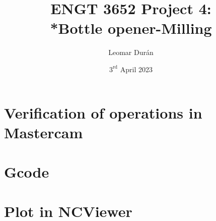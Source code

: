 \documentclass{report}
\title{ENGT 3652 Project 4:\\*Bottle opener-Milling}
\author{Leomar Dur\'an}
\date{$3^{\text{rd}}$ April 2023}
\begin{document}
\maketitle

\chapter{Verification of operations in Mastercam}



\chapter{Gcode}

\chapter{Plot in NCViewer}
\end{document}
